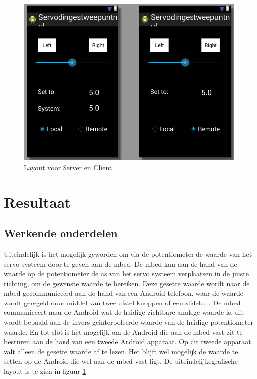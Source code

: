 \documentclass[a4paper]{article}
\begin{document}
	\begin{figure}
		\centering
		\includegraphics[scale=0.6]{imgs/layout3.png}
		\caption{Layout voor Server en Client}
		\label{fig:layout3}
	\end{figure}
	\newpage
	\section{Resultaat}
		\subsection{Werkende onderdelen}
			Uiteindelijk is het mogelijk geworden om via de potentiometer de waarde van het servo systeem door te geven aan de mbed. De mbed kan aan de hand van de waarde op de potentiometer de as van het servo systeem verplaatsen in de juiste richting, om de gewenste waarde te bereiken. Deze gesette waarde wordt naar de mbed gecommuniceerd aan de hand van een Android telefoon, waar de waarde wordt geregeld door middel van twee afstel knoppen of een slidebar. De mbed communiceert naar de Android wat de huidige zichtbare analoge waarde is, dit wordt bepaald aan de invers geinterpoleerde waarde van de huidige potentiometer waarde. En tot slot is het mogelijk om de Android die aan de mbed vast zit te besturen aan de hand van een tweede Android apparaat. Op dit tweede apparaat valt alleen de gesette waarde af te lezen. Het blijft wel mogelijk de waarde te setten op de Android die wel aan de mbed vast ligt. De uiteindelijkegrafische layout is te zien in figuur \ref{fig:layout3}
\end{document}
